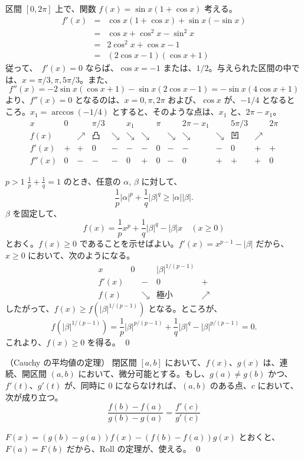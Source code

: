 \begin{eg}
区間 $[0,2\pi]$ 上で、関数 $f(x) = \sin x(1 + \cos x)$ 考える。
\begin{eqnarray*}
f'(x) & = & \cos x(1+ \cos x) + \sin x(-\sin x)\\
        & = & \cos x + \cos^2 x - \sin^2 x\\
        & = & 2\cos^2 x + \cos x - 1\\
        & = & (2\cos x -1)(\cos x+ 1)
\end{eqnarray*}
従って、　$f'(x) = 0$ ならば、$\cos x = -1$ または、$1/2$。与えられた区間の中では、$x = \pi/3, \pi, 5\pi/3$。また、
$$f''(x) = -2\sin x(\cos x +1) - \sin x(2\cos x -1) = -\sin x(4\cos x +1)$$
より、$f''(x) = 0$ となるのは、$x = 0, \pi, 2\pi$ および、$\cos x$ が、$-1/4$ となるところ。$x_1 = \arccos (-1/4)$ とすると、そのような点は、$x_1$ と、$2\pi - x_1$。
$$\begin{array}{c|ccccccccccccc}
x & 0 &  & \pi/3 & & x_1 & & \pi & & 2\pi-x_1 & & 5\pi/3 & & 2\pi\\
\hline 
f(x) & & \nearrow & \mbox{凸} & \searrow &  \searrow & \searrow & & \searrow & \searrow & \searrow & \mbox{凹} & \nearrow & \\
f'(x) & + & + & 0 & - & - & - & 0 & - & - & - & 0 & + & + \\
f''(x) & 0 & - & - & - & 0 & + & 0 & - & 0 & + & + & + & 0 
\end{array}$$
\end{eg}

\begin{eg}
$p>1$ $\frac{1}{p} + \frac{1}{q} = 1$ のとき、任意の $\alpha$, $\beta$ に対して、
$$\frac{1}{p}|\alpha|^p + \frac{1}{q}|\beta|^q \geq |\alpha||\beta|.$$
\proof
$\beta$ を固定して、
$$f(x) = \frac{1}{p}x^p + \frac{1}{q}|\beta|^q - |\beta|x\quad(x\geq 0)$$
とおく。$f(x)\geq 0$ であることを示せばよい。$f'(x) = x^{p-1} - |\beta|$ だから、$x\geq 0$  において、次のようになる。
$$\begin{array}{c|cccc}
x & 0 &  & |\beta|^{1/(p-1)} & \\
\hline 
f'(x) & & - & 0 & + \\
f(x) & & \searrow & \mbox{極小} & \nearrow 
\end{array}$$
したがって、$f(x)\geq f(|\beta|^{1/(p-1)})$ となる。ところが、
$$f(|\beta|^{1/(p-1)}) = \frac{1}{p}|\beta|^{p/(p-1)} + \frac{1}{q}|\beta|^{q} - |\beta|^{p/(p-1)} = 0.$$
これより、$f(x)\geq 0$ を得る。
\qed
\end{eg}

\newpage{}
\begin{thm} （Cauchy の平均値の定理）\label{thm:cauchy-mvt}
閉区間 $[a,b]$ において、$f(x)$、$g(x)$ は、連続、開区間 $(a,b)$ において、微分可能とする。もし、$g(a)\neq g(b)$  かつ、$f'(t)$、$g'(t)$  が、同時に $0$ にならなければ、$(a,b)$ のある点、$c$ において、 次が成り立つ。
$$\frac{f(b) - f(a)}{g(b) - g(a)} = \frac{f'(c)}{g'(c)}$$
\end{thm}
\proof
$F(x) = (g(b) - g(a))f(x) - (f(b) - f(a))g(x)$  とおくと、$F(a) = F(b)$ だから、Roll の定理が、使える。
\qed

